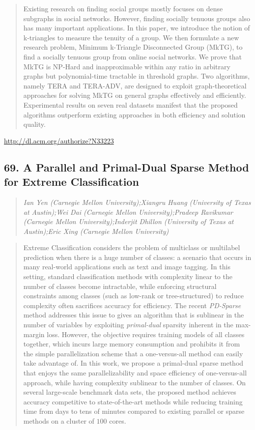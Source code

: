 \documentclass{article}
\begin{document}
\begin{quote}
Existing research on finding social groups mostly focuses on dense subgraphs in social networks. However, finding socially tenuous groups also has many important applications. In this paper, we introduce the notion of k-triangles to measure the tenuity of a group. We then formulate a new research problem, Minimum k-Triangle Disconnected Group (MkTG), to find a socially tenuous group from online social networks. We prove that MkTG is NP-Hard and inapproximable within any ratio in arbitrary graphs but polynomial-time tractable in threshold graphs. Two algorithms, namely TERA and TERA-ADV, are designed to exploit graph-theoretical approaches for solving MkTG on general graphs effectively and efficiently. Experimental results on seven real datasets manifest that the proposed algorithms outperform existing approaches in both efficiency and solution quality.
\end{quote}

\href{http://dl.acm.org/authorize?N33223}{http://dl.acm.org/authorize?N33223}

\subsection{69. A Parallel and Primal-Dual Sparse Method for Extreme Classification}

\begin{quote}
\footnotesize{\textit{Ian Yen (Carnegie Mellon University);Xiangru Huang (University of Texas at Austin);Wei Dai (Carnegie Mellon University);Pradeep Ravikumar (Carnegie Mellon University);Inderjit Dhillon (University of Texas at Austin);Eric Xing (Carnegie Mellon University)}}

\end{quote}

\begin{quote}
Extreme Classification considers the problem of multiclass or multilabel prediction when there is a huge number of classes: a scenario that occurs in many real-world applications such as text and image tagging. In this setting, standard classification methods with complexity linear to the number of classes become intractable, while enforcing structural constraints among classes (such as low-rank or tree-structured) to reduce complexity often sacrifices accuracy for efficiency. The recent \emph{PD-Sparse} method addresses this issue to gives an algorithm that is sublinear in the number of variables by exploiting \emph{primal-dual} sparsity inherent in the max-margin loss. However, the objective requires training models of all classes together, which incurs large memory consumption and prohibits it from the simple parallelization scheme that a one-versus-all method can easily take advantage of. In this work, we propose a primal-dual sparse method that enjoys the same parallelizability and space efficiency of one-versus-all approach, while having complexity sublinear to the number of classes. On several large-scale benchmark data sets, the proposed method achieves accuracy competitive to state-of-the-art methods while reducing training time from days to tens of minutes compared to existing parallel or sparse methods on a cluster of $100$ cores.
\end{quote}
\end{document}
